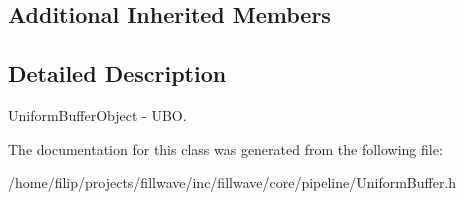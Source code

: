 \subsection*{Additional Inherited Members}


\subsection{Detailed Description}
Uniform\+Buffer\+Object -\/ U\+BO. 

The documentation for this class was generated from the following file\+:\begin{DoxyCompactItemize}
\item 
/home/filip/projects/fillwave/inc/fillwave/core/pipeline/Uniform\+Buffer.\+h\end{DoxyCompactItemize}
